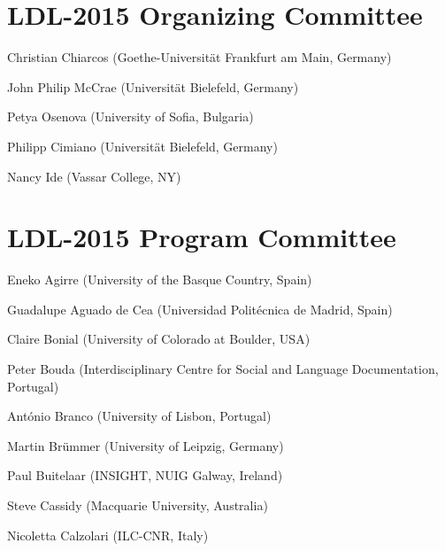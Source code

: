 \documentclass[11pt]{article}
\begin{document}
\begin{figure*}[t]
\begin{minipage}{\textwidth}
\section*{LDL-2015 Organizing Committee}

\smallskip


Christian Chiarcos (Goethe-Universität Frankfurt am Main, Germany)

John Philip McCrae (Universität Bielefeld, Germany)

Petya Osenova (University of Sofia, Bulgaria)

Philipp Cimiano (Universität Bielefeld, Germany)

Nancy Ide (Vassar College, NY) 


\bigskip

\section*{LDL-2015 Program Committee}

\smallskip

    Eneko Agirre (University of the Basque Country, Spain)										%
	
    Guadalupe Aguado de Cea (Universidad Politécnica de Madrid, Spain)							%
	
    Claire Bonial (University of Colorado at Boulder, USA)										%
	
    Peter Bouda (Interdisciplinary Centre for Social and Language Documentation, Portugal)		%
	
    António Branco (University of Lisbon, Portugal)												%
	
    Martin Brümmer (University of Leipzig, Germany)												%
	
    Paul Buitelaar (INSIGHT, NUIG Galway, Ireland)												%
		
    Steve Cassidy (Macquarie University, Australia)												%
	
    Nicoletta Calzolari (ILC-CNR, Italy)														%
	
	
	

\end{minipage}
\end{figure*}
\end{document}
